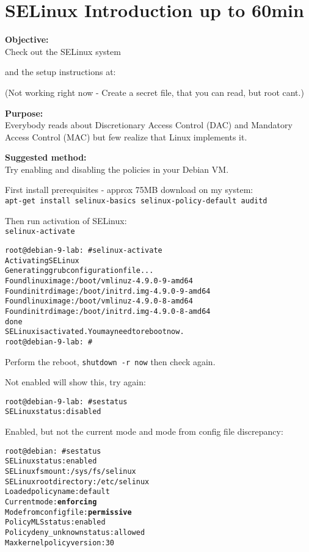 \documentclass[a4paper,11pt,notitlepage]{report}
\begin{document}
\chapter{SELinux Introduction up to 60min}
\label{ex:se-linux-intro}

{\bf Objective:}\\
Check out the SELinux system\\

and the setup instructions at:\\

(Not working right now - Create a secret file, that you can read, but root cant.)

{\bf Purpose:}\\
Everybody reads about Discretionary Access Control (DAC) and Mandatory Access Control (MAC) but few realize that Linux implements it.


{\bf Suggested method:}\\
Try enabling and disabling the policies in your Debian VM.

First install prerequisites - approx 75MB download on my system:\\
\verb+apt-get install selinux-basics selinux-policy-default auditd+

Then run activation of SELinux:\\
\verb+selinux-activate+

\begin{alltt}
  root@debian-9-lab:~# selinux-activate
  Activating SE Linux
  Generating grub configuration file ...
  Found linux image: /boot/vmlinuz-4.9.0-9-amd64
  Found initrd image: /boot/initrd.img-4.9.0-9-amd64
  Found linux image: /boot/vmlinuz-4.9.0-8-amd64
  Found initrd image: /boot/initrd.img-4.9.0-8-amd64
  done
  SE Linux is activated.  You may need to reboot now.
  root@debian-9-lab:~#
\end{alltt}

Perform the reboot, \verb+shutdown -r now+ then check again.

Not enabled will show this, try again:
\begin{alltt}
root@debian-9-lab:~# sestatus
SELinux status:                 disabled
\end{alltt}

Enabled, but not the current mode and mode from config file discrepancy:
\begin{alltt}
root@debian:~# sestatus
SELinux status:                 enabled
SELinuxfs mount:                /sys/fs/selinux
SELinux root directory:         /etc/selinux
Loaded policy name:             default
Current mode:                   {\bf enforcing}
Mode from config file:          {\bf permissive}
Policy MLS status:              enabled
Policy deny_unknown status:     allowed
Max kernel policy version:      30
\end{alltt}
\end{document}
